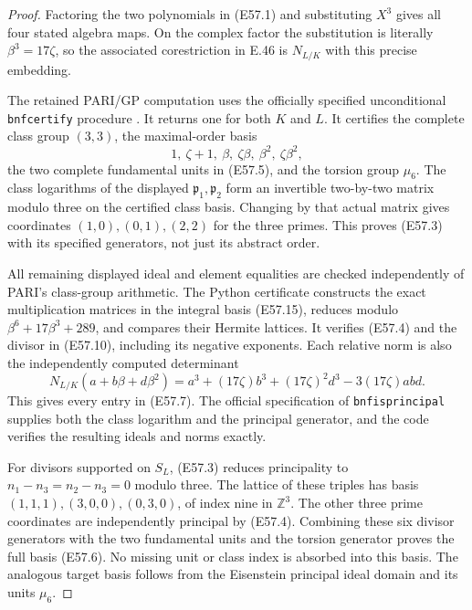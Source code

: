 \begin{proof}
Factoring the two polynomials in (E57.1) and
substituting $X^3$ gives all four stated
algebra maps. On the complex factor the
substitution is literally $\beta^3=17\zeta$,
so the associated corestriction in E.46 is
$N_{L/K}$ with this precise embedding.

The retained PARI/GP computation uses the
officially specified unconditional
\texttt{bnfcertify} procedure
\cite{E_PARICertifiedUnits}. It returns one
for both $K$ and $L$. It certifies the complete
class group $(3,3)$, the maximal-order basis
\[
 1,\ \zeta+1,\ \beta,\ \zeta\beta,\ \beta^2,\ \zeta\beta^2,
 \tag{E57.15}
\]
the two complete fundamental units in
(E57.5), and the torsion group $\mu_6$.
The class logarithms of the displayed
$\mathfrak p_1,\mathfrak p_2$ form an
invertible two-by-two matrix modulo three
on the certified class basis. Changing
by that actual matrix gives coordinates
$(1,0),(0,1),(2,2)$ for the three primes.
This proves (E57.3) with its specified
generators, not just its abstract order.

All remaining displayed ideal and element
equalities are checked independently of
PARI's class-group arithmetic. The Python
certificate constructs the exact
multiplication matrices in the integral
basis (E57.15), reduces modulo
$\beta^6+17\beta^3+289$, and compares their
Hermite lattices. It verifies (E57.4) and
the divisor in (E57.10), including its
negative exponents. Each relative norm is
also the independently computed determinant
\[
 N_{L/K}(a+b\beta+d\beta^2)
    =a^3+(17\zeta)b^3+(17\zeta)^2d^3
                                      -3(17\zeta)abd .
 \tag{E57.16}
\]
This gives every entry in (E57.7).
The official specification of
\texttt{bnfisprincipal} supplies both the
class logarithm and the principal
generator, and the code verifies the
resulting ideals and norms exactly.

For divisors supported on $S_L$, (E57.3)
reduces principality to
$n_1-n_3=n_2-n_3=0$ modulo three.
The lattice of these triples has basis
$(1,1,1),(3,0,0),(0,3,0)$, of index nine
in $\mathbb Z^3$. The other three prime
coordinates are independently principal
by (E57.4). Combining these six divisor
generators with the two fundamental units
and the torsion generator proves the
full basis (E57.6). No missing unit or
class index is absorbed into this basis.
The analogous target basis follows
from the Eisenstein principal ideal
domain and its units $\mu_6$.


\end{proof}
